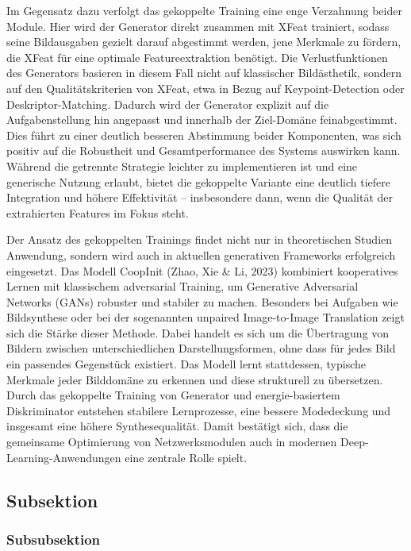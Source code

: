 Im Gegensatz dazu verfolgt das gekoppelte Training eine enge Verzahnung beider Module. Hier wird der Generator direkt zusammen mit XFeat trainiert, sodass seine Bildausgaben gezielt darauf abgestimmt werden, jene Merkmale zu fördern, die XFeat für eine optimale Featureextraktion benötigt. Die Verlustfunktionen des Generators basieren in diesem Fall nicht auf klassischer Bildästhetik, sondern auf den Qualitätskriterien von XFeat, etwa in Bezug auf Keypoint-Detection oder Deskriptor-Matching. Dadurch wird der Generator explizit auf die Aufgabenstellung hin angepasst und innerhalb der Ziel-Domäne feinabgestimmt. Dies führt zu einer deutlich besseren Abstimmung beider Komponenten, was sich positiv auf die Robustheit und Gesamtperformance des Systems auswirken kann.
Während die getrennte Strategie leichter zu implementieren ist und eine generische Nutzung erlaubt, bietet die gekoppelte Variante eine deutlich tiefere Integration und höhere Effektivität – insbesondere dann, wenn die Qualität der extrahierten Features im Fokus steht.

Der Ansatz des gekoppelten Trainings findet nicht nur in theoretischen Studien Anwendung, sondern wird auch in aktuellen generativen Frameworks erfolgreich eingesetzt. Das Modell CoopInit (Zhao, Xie \& Li, 2023) kombiniert kooperatives Lernen mit klassischem adversarial Training, um Generative Adversarial Networks (GANs) robuster und stabiler zu machen. Besonders bei Aufgaben wie Bildsynthese oder bei der sogenannten unpaired Image-to-Image Translation zeigt sich die Stärke dieser Methode. Dabei handelt es sich um die Übertragung von Bildern zwischen unterschiedlichen Darstellungsformen, ohne dass für jedes Bild ein passendes Gegenstück existiert. Das Modell lernt stattdessen, typische Merkmale jeder Bilddomäne zu erkennen und diese strukturell zu übersetzen. Durch das gekoppelte Training von Generator und energie-basiertem Diskriminator entstehen stabilere Lernprozesse, eine bessere Modedeckung und insgesamt eine höhere Synthesequalität. Damit bestätigt sich, dass die gemeinsame Optimierung von Netzwerksmodulen auch in modernen Deep-Learning-Anwendungen eine zentrale Rolle spielt.

\subsection{Subsektion}



\subsubsection{Subsubsektion}







